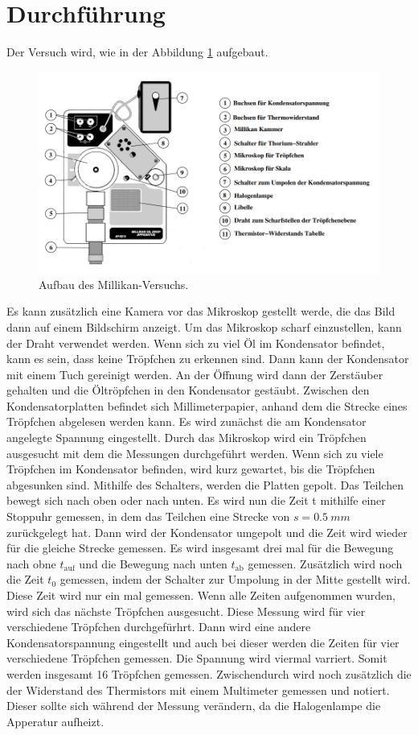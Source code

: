 \section{Durchführung}
\label{sec:Durchführung}

Der Versuch wird, wie in der Abbildung \ref{fig:Ftröpfchen} aufgebaut.
\begin{figure}[H]
    \centering
    \includegraphics[scale=0.5]{content/Aufbau.png}
    \caption{Aufbau des Millikan-Versuchs.}
    \label{fig:Ftröpfchen}
\end{figure}

Es kann zusätzlich eine Kamera vor das Mikroskop gestellt werde, die das Bild dann auf einem Bildschirm anzeigt.
Um das Mikroskop scharf einzustellen, kann der Draht verwendet werden.
Wenn sich zu viel Öl im Kondensator befindet, kann es sein, dass keine Tröpfchen zu erkennen sind.
Dann kann der Kondensator mit einem Tuch gereinigt werden.
An der Öffnung wird dann der Zerstäuber gehalten und die Öltröpfchen in den Kondensator gestäubt.
Zwischen den Kondensatorplatten befindet sich Millimeterpapier, anhand dem die Strecke eines Tröpfchen abgelesen werden kann.
Es wird zunächst die am Kondensator angelegte Spannung eingestellt.
Durch das Mikroskop wird ein Tröpfchen ausgesucht mit dem die Messungen durchgeführt werden.
Wenn sich zu viele Tröpfchen im Kondensator befinden, wird kurz gewartet, bis die Tröpfchen abgesunken sind.
Mithilfe des Schalters, werden die Platten gepolt. Das Teilchen bewegt sich nach oben oder nach unten.
Es wird nun die Zeit t mithilfe einer Stoppuhr gemessen, in dem das Teilchen eine Strecke von $s = \qty{0.5}{mm}$ zurückgelegt hat.
Dann wird der Kondensator umgepolt und die Zeit wird wieder für die gleiche Strecke gemessen.
Es wird insgesamt drei mal für die Bewegung nach obne $t_\text{auf}$ und die Bewegung nach unten $t_\text{ab}$ gemessen.
Zusätzlich wird noch die Zeit $t_0$ gemessen, indem der Schalter zur Umpolung in der Mitte gestellt wird.
Diese Zeit wird nur ein mal gemessen.
Wenn alle Zeiten aufgenommen wurden, wird sich das nächste Tröpfchen ausgesucht.
Diese Messung wird für vier verschiedene Tröpfchen durchgefürhrt.
Dann wird eine andere Kondensatorspannung eingestellt und auch bei dieser werden die Zeiten für vier verschiedene Tröpfchen gemessen.
Die Spannung wird viermal varriert.
Somit werden insgesamt 16 Tröpfchen gemessen.
Zwischendurch wird noch zusätzlich die der Widerstand des Thermistors mit einem Multimeter gemessen und notiert. 
Dieser sollte sich während der Messung verändern, da die Halogenlampe die Apperatur aufheizt.
